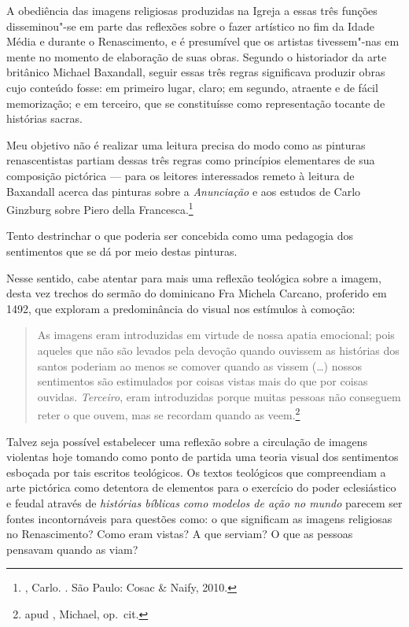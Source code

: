 A obediência das imagens religiosas produzidas na Igreja
a essas três funções disseminou"-se em parte das reflexões
sobre o fazer artístico no fim da Idade Média e durante o Renascimento,
e é presumível que os artistas tivessem"-nas em mente no momento de
elaboração de suas obras. Segundo o historiador da arte britânico
Michael Baxandall, seguir essas três regras significava produzir obras
cujo conteúdo fosse: em primeiro lugar, claro; em segundo, atraente e de
fácil memorização; e em terceiro, que se constituísse como representação
tocante de histórias sacras.

Meu objetivo não é realizar uma leitura precisa do modo como as pinturas
renascentistas partiam dessas três regras como princípios elementares de
sua composição pictórica --- para os leitores interessados remeto à
leitura de Baxandall acerca das pinturas sobre a \emph{Anunciação} e aos
estudos de Carlo Ginzburg sobre Piero della Francesca.\footnote{,
  Carlo. {}. São Paulo: Cosac \& Naify, 2010.}

Tento
destrinchar o que poderia ser concebida como uma pedagogia dos
sentimentos que se dá por meio destas pinturas.


Nesse sentido, cabe atentar para mais uma reflexão teológica sobre a
imagem, desta vez trechos do sermão do dominicano Fra Michela Carcano,
proferido em 1492, que exploram a predominância do visual nos estímulos
à comoção:

\begin{quote}
As imagens eram introduzidas em virtude de nossa apatia
emocional; pois aqueles que não são levados pela devoção quando ouvissem
as histórias dos santos poderiam ao menos se comover quando as vissem
(\ldots{}) nossos sentimentos são estimulados por coisas vistas mais do que
por coisas ouvidas. \emph{Terceiro}, eram introduzidas porque muitas
pessoas não conseguem reter o que ouvem, mas se recordam quando as
veem.\footnote{ apud , Michael, op.~cit.}
\end{quote}

Talvez seja possível estabelecer uma reflexão sobre a circulação de
imagens violentas hoje tomando como ponto de partida uma teoria visual
dos sentimentos esboçada por tais escritos teológicos. Os textos
teológicos que compreendiam a arte pictórica como detentora de elementos
para o exercício do poder eclesiástico e feudal através de
\emph{histórias bíblicas como modelos de ação no mundo} parecem ser
fontes incontornáveis para questões como: o que significam as imagens
religiosas no Renascimento? Como eram vistas? A que serviam? O que as
pessoas pensavam quando as viam?

